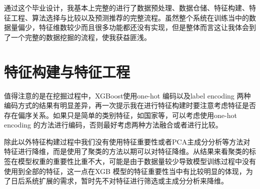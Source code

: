 %
%
%
%
%
%

\renewcommand{\thechapter}{结论}



通过这个毕业设计，我基本上完整的进行了数据预处理、数据仓储、特征构建、特征工程、算法选择与比较以及预测推荐的完整流程。虽然整个系统在训练当中的数据量偏少，特征维数较少而且很多功能都还没有实现，但是整体而言这让我体会到了一个完整的数据挖掘的流程，使我获益匪浅。

\section{特征构建与特征工程}

值得注意的是在挖掘过程中，XGBoost使用one-hot 编码以及label encoding 两种编码方式的结果有明显差异，再一次提示我在进行特征构建时要注意考虑特征是否存在偏序关系。如果只是简单的类别特征，如国家等，可以考虑使用one-hot encoding 的方法进行编码，否则最好考虑两种方法融合或者进行比较。

除此以外特征构建过程中我们没有使用特征重要性或者PCA主成分分析等方法对特征进行降维，而是使用了聚类的方法以期可以对特征降维。从结果来看聚类的标签在模型权重的重要性比重不大，可能是由于数据量较少导致模型训练过程中没有使用到全部的特征，这一点在XGB 模型的特征重要性当中有比较明显的体现，为了日后系统扩展的需求，暂时先不对特征进行筛选或主成分分析来降维。


